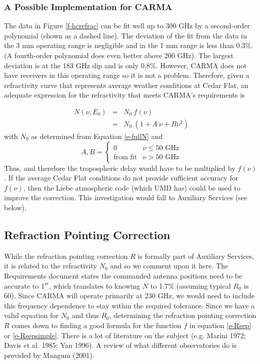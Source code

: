 \documentclass[preprint]{aastex}
\newcommand{\scrL}{ %
   \ifmmode{{\mathscr L}}
   \else{${\mathscr L}$\/}
   \fi}
\begin{document}
\subsubsection{A Possible Implementation for CARMA}

The data in Figure \ref{f-hcrefrac} can be fit well up to 300 GHz by
a second-order polynomial (shown as a dashed line).  The deviation of
the fit from the data in the 3 mm operating range is negligible and in
the 1 mm range is less than 0.3\%.  (A fourth-order polynomial does even
better above 200 GHz).  The largest deviation is at the 183 GHz dip and
is only 0.8\%.  However, CARMA does not have receivers in this operating
range so it is not a problem.  Therefore, given a refractivity curve that
represents average weather conditions at Cedar Flat, an adequate expression 
for the refractivity that meets CARMA's requirements is

\begin{eqnarray}
N(\nu,E_0) & = & N_0 ~ f(\nu) \\
  & = & N_0 ~ (1 + A~\nu + B\nu^2)
\end{eqnarray}
\noindent with $N_0$ as determined from Equation \ref{e-fullN} and 
\[
  A,B = \left\{ \begin{array}{ll}
                   0 & \mbox{$\nu \leq 50$ GHz} \\
                   \mbox{from fit} & \mbox{$\nu > 50$ GHz}
                 \end{array} 
          \right. 
\]
\noindent 
Thus, \scrL and therefore the tropospheric delay would 
have to be multiplied by $f(\nu)$.
If the average Cedar Flat conditions do not provide sufficient accuracy
for $f(\nu)$, then the Liebe atmospheric code (which UMD has) could be
used to improve the correction.   This investigation would fall to
Auxiliary Services (see below).

\subsection{Refraction Pointing Correction}

While the refraction pointing correction $R$ is formally part of Auxiliary
Services, it is related to the refractivity $N_0$ and so we comment upon
it here.  The Requirements document states the commanded antenna positions
need to be accurate to 1$\mbox{$^{\prime\prime}$}$, which translates to knowing $N$ to
1.7\% (assuming typical $R_0$ is 60\arcsec).  Since CARMA will operate
primarily at 230 GHz, we would need to include this frequency dependence
to stay within the required tolerance.  Since we have a valid equation
for $N_0$ and thus $R_0$, determining the refraction pointing correction
$R$ comes down to finding a good formula for the function $f$ in equation
\ref{e-Rsep} or \ref{e-Rsepsimple}.  There is a lot of literature on the
subject (e.g. Marini 1972; Davis et al. 1985; Yan 1996). A review of what
different observatories do is provided by Mangum (2001).
\end{document}
